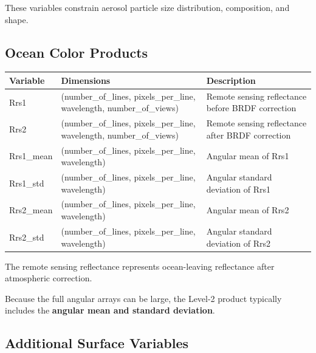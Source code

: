 \documentclass[
  letterpaper,
]{scrbook}
\begin{document}
These variables constrain aerosol particle size distribution,
composition, and shape.

\subsection{Ocean Color Products}\label{ocean-color-products}

\begin{longtable}[]{@{}
  >{\raggedright\arraybackslash}p{}
  >{\raggedright\arraybackslash}p{}
  >{\raggedright\arraybackslash}p{}@{}}
\toprule\noalign{}
\begin{minipage}[b]{\linewidth}\raggedright
Variable
\end{minipage} & \begin{minipage}[b]{\linewidth}\raggedright
Dimensions
\end{minipage} & \begin{minipage}[b]{\linewidth}\raggedright
Description
\end{minipage} \\
\midrule\noalign{}
\endhead
\bottomrule\noalign{}
\endlastfoot
Rrs1 & (number\_of\_lines, pixels\_per\_line, wavelength,
number\_of\_views) & Remote sensing reflectance before BRDF
correction \\
Rrs2 & (number\_of\_lines, pixels\_per\_line, wavelength,
number\_of\_views) & Remote sensing reflectance after BRDF correction \\
Rrs1\_mean & (number\_of\_lines, pixels\_per\_line, wavelength) &
Angular mean of Rrs1 \\
Rrs1\_std & (number\_of\_lines, pixels\_per\_line, wavelength) & Angular
standard deviation of Rrs1 \\
Rrs2\_mean & (number\_of\_lines, pixels\_per\_line, wavelength) &
Angular mean of Rrs2 \\
Rrs2\_std & (number\_of\_lines, pixels\_per\_line, wavelength) & Angular
standard deviation of Rrs2 \\
\end{longtable}

The remote sensing reflectance represents ocean-leaving reflectance
after atmospheric correction.

Because the full angular arrays can be large, the Level-2 product
typically includes the \textbf{angular mean and standard deviation}.

\subsection{Additional Surface
Variables}\label{additional-surface-variables}
\end{document}
